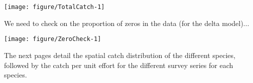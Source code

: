 \documentclass[12pt]{article}\usepackage[]{graphicx}\usepackage[]{color}
\makeatletter
\def\maxwidth{ %
  \ifdim\Gin@nat@width>\linewidth
    \linewidth
  \else
    \Gin@nat@width
  \fi
}
\newenvironment{knitrout}{}{} %
\makeatother
\begin{document}
\begin{knitrout}\footnotesize
{}\color{fgcolor}

{\centering \texttt{[image: figure/TotalCatch-1]} 

}



\end{knitrout}

We need to check on the proportion of zeros in the data (for the delta
model)...


\begin{knitrout}\footnotesize
{}\color{fgcolor}

{\centering \texttt{[image: figure/ZeroCheck-1]} 

}



\end{knitrout}

The next pages detail the spatial catch distribution of the different species,
followed by the catch per unit effort for the different survey series for each
species. 
\end{document}
